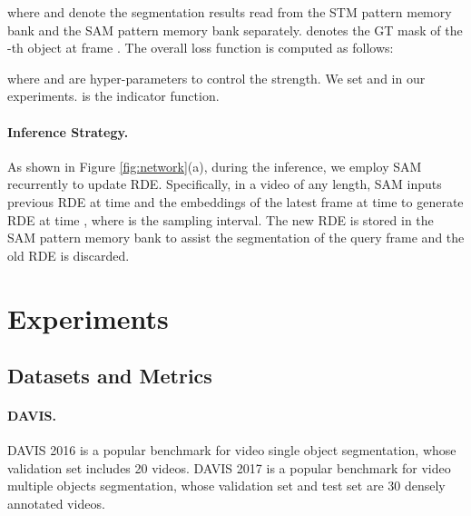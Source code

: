 \documentclass[10pt,twocolumn,letterpaper]{article}
\begin{document}
where  and  denote the segmentation results read from the STM pattern memory bank and the SAM pattern memory bank separately.  denotes the GT mask of the -th object at frame . The overall loss function is computed as follows:

where  and  are hyper-parameters to control the strength. We set  and  in our experiments.  is the indicator function.

\paragraph{Inference Strategy.}
As shown in Figure \ref{fig:network}(a), during the inference, we employ SAM recurrently to update RDE. Specifically, in a video of any length, SAM inputs previous RDE at time  and the embeddings of the latest frame at time   to generate RDE at time , where  is the sampling interval. The new RDE is stored in the SAM pattern memory bank to assist the segmentation of the query frame and the old RDE is discarded.
































\section{Experiments}
\subsection{Datasets and Metrics}
\paragraph{DAVIS.} DAVIS 2016 \cite{davis16} is a popular benchmark for  video single object segmentation, whose validation set includes  20 videos. DAVIS 2017 \cite{davis17} is a popular benchmark for video multiple objects segmentation, whose validation set and test set are 30 densely annotated videos. 
\vspace{-0.3em}
\end{document}
